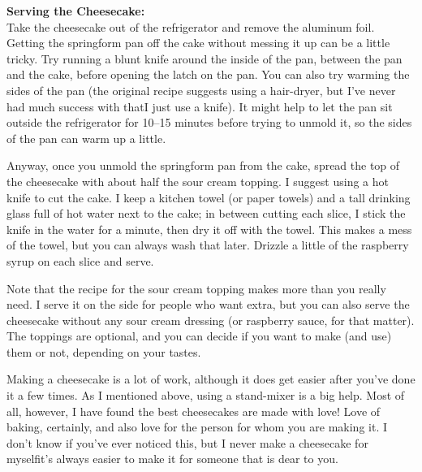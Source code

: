 \noindent \textbf{Serving the Cheesecake:} \\ 
Take the cheesecake out of the refrigerator and remove the aluminum foil. 
Getting the springform pan off the cake without messing it up can be a little tricky. 
Try running a blunt knife around the inside of the pan, between the pan and the cake, before opening the latch on the pan. 
You can also try warming the sides of the pan (the original recipe suggests using a hair-dryer, but I’ve never had much success with that\textemdash I just use a knife). 
It might help to let the pan sit outside the refrigerator for 10–15 minutes before trying to unmold it, so the sides of the pan can warm up a little.

Anyway, once you unmold the springform pan from the cake, spread the top of the cheesecake with about half the sour cream topping. 
I suggest using a hot knife to cut the cake. 
I keep a kitchen towel (or paper towels) and a tall drinking glass full of hot water next to the cake; in between cutting each slice, I stick the knife in the water for a minute, then dry it off with the towel. 
This makes a mess of the towel, but you can always wash that later. 
Drizzle a little of the raspberry syrup on each slice and serve.

Note that the recipe for the sour cream topping makes more than you really need. 
I serve it on the side for people who want extra, but you can also serve the cheesecake without any sour cream dressing (or raspberry sauce, for that matter). 
The toppings are optional, and you can decide if you want to make (and use) them or not, depending on your tastes.

Making a cheesecake is a lot of work, although it does get easier after you’ve done it a few times. As I mentioned above, using a stand-mixer is a big help. Most of all, however,  
I have found the best cheesecakes are made with love! 
Love of baking, certainly, and also love for the person for whom you are making it. 
I don’t know if you’ve ever noticed this, but I never make a cheesecake for myself\textemdash it’s always easier to make it for someone that is dear to you.

\vspace*{0.75 cm}

\begin{recipeblock}
	\noindent
\end{recipeblock}